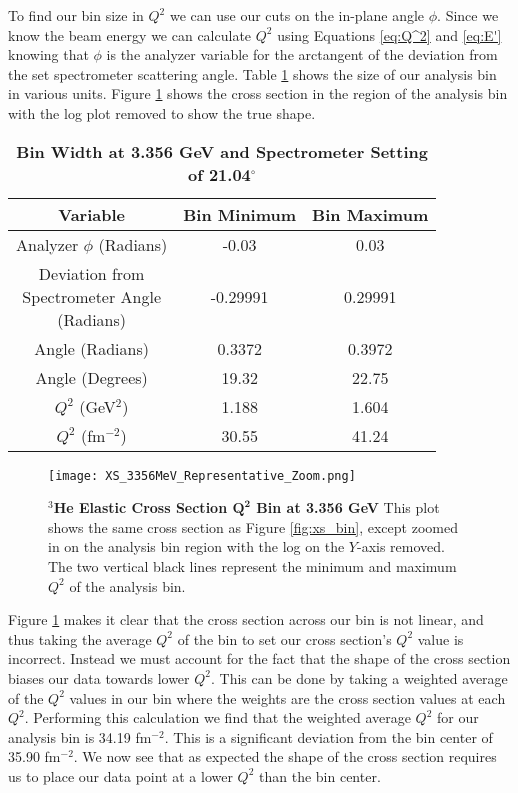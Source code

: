 To find our bin size in $Q^2$ we can use our cuts on the in-plane angle $\phi$. Since we know the beam energy we can calculate $Q^2$ using Equations \ref{eq:Q^2} and \ref{eq:E'} knowing that $\phi$ is the analyzer variable for the arctangent of the deviation from the set spectrometer scattering angle. Table \ref{tab:bin} shows the size of our analysis bin in various units. Figure \ref{fig:xs_bin_zoom} shows the cross section in the region of the analysis bin with the log plot removed to show the true shape.

\vspace{5mm}

\begin{table}[!h]
\centering
\begin{tabular}{|c | c c |}
\hline
\textbf{Variable} & \textbf{Bin Minimum} & \textbf{Bin Maximum}\\
\hline
Analyzer $\phi$ (Radians) & -0.03 & 0.03\\ 
\makecell{Deviation from \\ Spectrometer Angle \\ (Radians)} & -0.29991 & 0.29991\\
Angle (Radians) & 0.3372 &  0.3972\\
Angle (Degrees) & 19.32 & 22.75\\
$Q^2$ (GeV$^2$) & 1.188 & 1.604\\
$Q^2$ (fm$^{-2}$) & 30.55 & 41.24\\
\hline
\end{tabular}
\caption[Bin Width at 3.356 GeV and Spectrometer Setting of 21.04$^\circ$]{{\bf{Bin Width at 3.356 GeV and Spectrometer Setting of 21.04$^\circ$}} }
\label{tab:bin}
\end{table}

\begin{figure}[!ht]
\begin{center}
\texttt{[image: XS\_3356MeV\_Representative\_Zoom.png]}
\end{center}
\caption[$^3$He Elastic Cross Section $Q^2$ Bin at $E_0$ 3.356 GeV]{
{\bf{$^3$He Elastic Cross Section $\boldsymbol{Q^2}$ Bin at 3.356 GeV}} This plot shows the same cross section as Figure \ref{fig:xs_bin}, except zoomed in on the analysis bin region with the log on the $Y$-axis removed. The two vertical black lines represent the minimum and maximum $Q^2$ of the analysis bin.}
\label{fig:xs_bin_zoom}
\end{figure}

Figure \ref{fig:xs_bin_zoom} makes it clear that the cross section across our bin is not linear, and thus taking the average $Q^2$ of the bin to set our cross section's $Q^2$ value is incorrect. Instead we must account for the fact that the shape of the cross section biases our data towards lower $Q^2$. This can be done by taking a weighted average of the $Q^2$ values in our bin where the weights are the cross section values at each $Q^2$. Performing this calculation we find that the weighted average $Q^2$ for our analysis bin is 34.19 fm$^{-2}$. This is a significant deviation from the bin center of 35.90 fm$^{-2}$. We now see that as expected the shape of the cross section requires us to place our data point at a lower $Q^2$ than the bin center.


